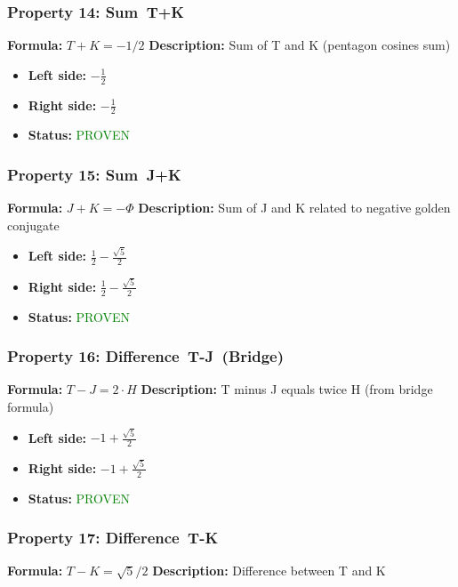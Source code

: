 \subsubsection*{Property 14: Sum~T+K}
\textbf{Formula:} $T + K = -1/2$
\textbf{Description:} Sum of T and K (pentagon cosines sum)

\begin{itemize}
\item \textbf{Left side:} $- \frac{1}{2}$
\item \textbf{Right side:} $- \frac{1}{2}$
\item \textbf{Status:} \textcolor{green}{PROVEN}
\end{itemize}

\subsubsection*{Property 15: Sum~J+K}
\textbf{Formula:} $J + K = -\Phi$
\textbf{Description:} Sum of J and K related to negative golden conjugate

\begin{itemize}
\item \textbf{Left side:} $\frac{1}{2} - \frac{\sqrt{5}}{2}$
\item \textbf{Right side:} $\frac{1}{2} - \frac{\sqrt{5}}{2}$
\item \textbf{Status:} \textcolor{green}{PROVEN}
\end{itemize}

\subsubsection*{Property 16: Difference~T-J~(Bridge)}
\textbf{Formula:} $T - J = 2 \cdot H$
\textbf{Description:} T minus J equals twice H (from bridge formula)

\begin{itemize}
\item \textbf{Left side:} $-1 + \frac{\sqrt{5}}{2}$
\item \textbf{Right side:} $-1 + \frac{\sqrt{5}}{2}$
\item \textbf{Status:} \textcolor{green}{PROVEN}
\end{itemize}

\subsubsection*{Property 17: Difference~T-K}
\textbf{Formula:} $T - K = \sqrt{5}/2$
\textbf{Description:} Difference between T and K

